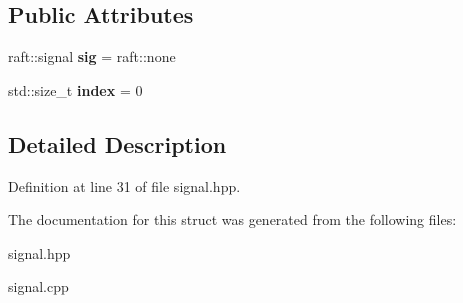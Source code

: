 \subsection*{Public Attributes}
\begin{DoxyCompactItemize}
\item 
\hypertarget{struct_buffer_1_1_signal_abd067e753526895dab1113766733263d}{}\label{struct_buffer_1_1_signal_abd067e753526895dab1113766733263d} 
raft\+::signal {\bfseries sig} = raft\+::none
\item 
\hypertarget{struct_buffer_1_1_signal_a7135d1d6f0a1f4f8624a0dfc06f2e5af}{}\label{struct_buffer_1_1_signal_a7135d1d6f0a1f4f8624a0dfc06f2e5af} 
std\+::size\+\_\+t {\bfseries index} = 0
\end{DoxyCompactItemize}


\subsection{Detailed Description}


Definition at line 31 of file signal.\+hpp.



The documentation for this struct was generated from the following files\+:\begin{DoxyCompactItemize}
\item 
signal.\+hpp\item 
signal.\+cpp\end{DoxyCompactItemize}
